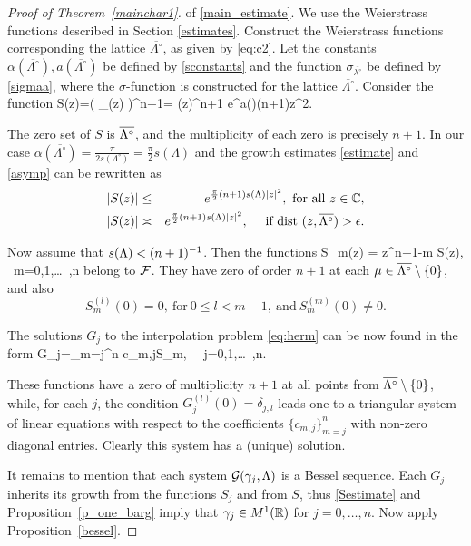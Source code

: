 \documentclass[12pt]{amsart}
\begin{document}
\begin{proof}[Proof of Theorem~\ref{mainchar1}]
   of \eqref{main_estimate}.
We use the Weierstrass functions described in  Section \ref{estimates}.
 Construct the Weierstrass functions corresponding the lattice
 $\overline{\Lambda^\circ}$, as  given by \eqref{eq:c2}.  Let the constants
 $\alpha(\overline{\Lambda^\circ}), a(\overline{\Lambda^{\circ}})$ 
 be defined by  \eqref{sconstants}  and the
 function $\sigma_{\overline{\lambda^\circ}}$ be defined by \eqref{sigmaa}, 
 where the $\sigma$-function is constructed for the lattice
 $\overline{\Lambda^\circ}$. Consider the function 
 \beq
 \label{Sfunction}
 S(z)=\big ( \sigma_{\ola}(z)  \big )^{n+1}=
         \sigma   (z)^{n+1}
e^{a(\ola)(n+1)z^2}.
 \eeq
 
 The zero set of $S$ is  $\overline{\Lambda^\circ}$,  and  the
 multiplicity of each zero is precisely  
 $n+1$. 
In our case $\alpha(\overline{\Lambda^{\circ}})
 =  \frac{\pi}{2 s(\Lambda ^\circ )} =  \frac \pi 2
s(\Lambda)$ and the growth estimates \eqref{estimate} and
\eqref{asymp} can be rewritten as  
 \begin{eqnarray}
\label{Sestimate}
|S(z)| &\leq & e^{\frac \pi 2 (n+1) s(\Lambda)|z|^2}, \  \text{for
  all} \ z\in \mathbb{C}, \\
   |S(z)| &\asymp &  e^{\frac \pi 2 (n+1) s(\Lambda)|z|^2},
  \quad \text{ if  }   \text{dist}\ (z,\overline{\Lambda^\circ})>\epsilon. 
  \label{Sestimate2}
  \end{eqnarray}

Now assume that $s(\Lambda ) < (n+1)^{-1} $. Then the functions 
 \beq
 \label{Sj}
 S_m(z) =  {z^{n+1-m}} S(z), \ m=0,1,\ldots \ ,n
 \eeq
 belong to $\mathcal{F}$. They have zero of order $n+1$ at each $\mu \in
 \overline{\Lambda^\circ} \setminus \{0\}$,  and also 
 \[
 S^{(l)}_m(0)=0, \  \text{for} \ 0\leq l < m-1, \ \text{and} \ S^{(m)}_m(0)\neq 0.
 \]
 
 The solutions $G_j$ to the interpolation problem \eqref{eq:herm} can
 be now found in the form 
 \beq
 \label{solutions}
 G_j=\sum_{m=j}^n c_{m,j}S_m, \,\,\,\,  j=0,1,\ldots \ ,n.
 \eeq
 
  These functions have a zero of multiplicity $n+1$ at all points from 
  $\overline{\Lambda^\circ} \setminus \{0\}$, while, for each $j$,  the  condition 
  $G_j^{(l)}(0)=\delta_{j,l}$ leads one to a triangular system of linear equations 
  with respect to the coefficients $ \{c_{m,j}\}_{m=j}^n$ with non-zero diagonal entries. 
  Clearly this system has a (unique) solution.
  
It remains to mention that each  system
$\mathcal{G}(\gamma _j, \Lambda )$ is a  Bessel sequence.  Each $G_j$
inherits its growth from the functions $S_j$ and from $S$, thus 
\eqref{Sestimate} and Proposition~\ref{p_one_barg} imply that $\gamma
_j \in M^1(\mathbb{R} ) $ for $j=0, \dots , n$. Now apply  Proposition~\ref{bessel}. 
   

\end{proof}
\end{document}
